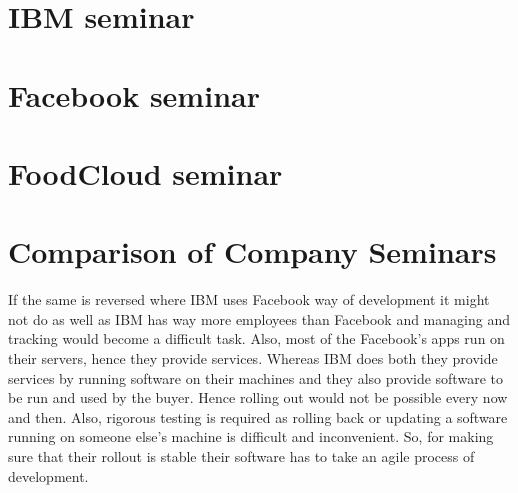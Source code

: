 \section{IBM seminar}


\section{Facebook seminar}


\section{FoodCloud seminar}


\section{Comparison of Company Seminars}

If the same is reversed where IBM uses Facebook way of development it might not do as well as IBM has way more employees than Facebook and managing and tracking would become a difficult task. Also, most of the Facebook's apps run on their servers, hence they provide services. Whereas IBM does both they provide services by running software on their machines and they also provide software to be run and used by the buyer. Hence rolling out would not be possible every now and then. Also, rigorous testing is required as rolling back or updating a software running on someone else's machine is difficult and inconvenient. So, for making sure that their rollout is stable their software has to take an agile process of development.
